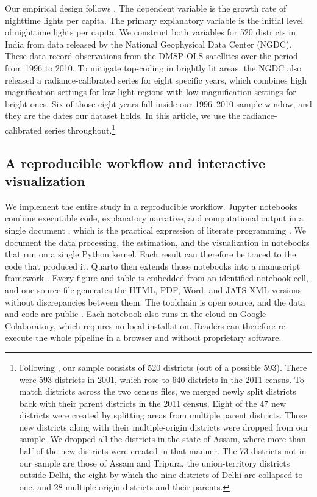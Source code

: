 \documentclass[
  a4paper, 
  twoside,
  final
]{article}
\newcounter{code}
\begin{document}
Our empirical design follows
\citet{chanda_kabiraj_district_convergence}. The dependent variable is
the growth rate of nighttime lights per capita. The primary explanatory
variable is the initial level of nighttime lights per capita. We
construct both variables for 520 districts in India from data released
by the National Geophysical Data Center (NGDC). These data record
observations from the DMSP-OLS satellites over the period from 1996 to
2010. To mitigate top-coding in brightly lit areas, the NGDC also
released a radiance-calibrated series for eight specific years, which
combines high magnification settings for low-light regions with low
magnification settings for bright ones. Six of those eight years fall
inside our 1996--2010 sample window, and they are the dates our dataset
holds. In this article, we use the radiance-calibrated series
throughout.\footnote{Following
  \citet{chanda_kabiraj_district_convergence}, our sample consists of
  520 districts (out of a possible 593). There were 593 districts in
  2001, which rose to 640 districts in the 2011 census. To match
  districts across the two census files, we merged newly split districts
  back with their parent districts in the 2011 census. Eight of the 47
  new districts were created by splitting areas from multiple parent
  districts. Those new districts along with their multiple-origin
  districts were dropped from our sample. We dropped all the districts
  in the state of Assam, where more than half of the new districts were
  created in that manner. The 73 districts not in our sample are those
  of Assam and Tripura, the union-territory districts outside Delhi, the
  eight by which the nine districts of Delhi are collapsed to one, and
  28 multiple-origin districts and their parents.}

\subsection{A reproducible workflow and interactive
visualization}\label{a-reproducible-workflow-and-interactive-visualization}

We implement the entire study in a reproducible workflow. Jupyter
notebooks combine executable code, explanatory narrative, and
computational output in a single document \citep{kluyver_jupyter}, which
is the practical expression of literate programming
\citep{knuth_literate}. We document the data processing, the estimation,
and the visualization in notebooks that run on a single Python kernel.
Each result can therefore be traced to the code that produced it. Quarto
then extends those notebooks into a manuscript framework
\citep{allaire_quarto}. Every figure and table is embedded from an
identified notebook cell, and one source file generates the HTML, PDF,
Word, and JATS XML versions without discrepancies between them. The
toolchain is open source, and the data and code are public
\citep{peng_reproducible}. Each notebook also runs in the cloud on
Google Colaboratory, which requires no local installation. Readers can
therefore re-execute the whole pipeline in a browser and without
proprietary software.
\end{document}
